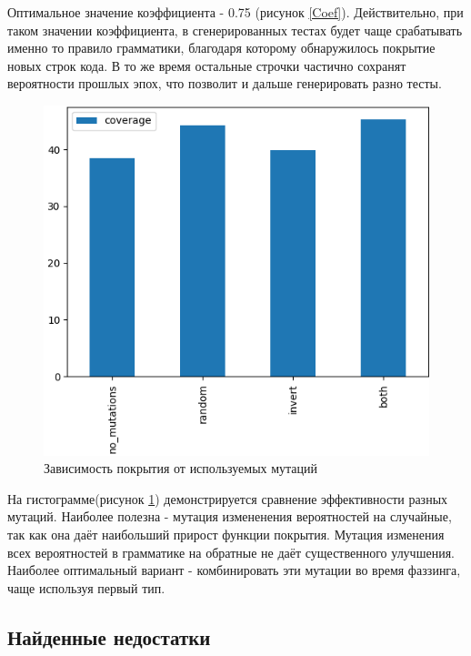 \documentclass[a4paper]{article}
\begin{document}
Оптимальное значение коэффициента - 0.75 (рисунок \ref{Coef}). Действительно, при таком значении коэффициента, в сгенерированных тестах будет чаще срабатывать именно то правило грамматики, благодаря которому обнаружилось покрытие новых строк кода. В то же время остальные строчки частично сохранят вероятности прошлых эпох, что позволит и дальше генерировать разно тесты.

\begin{figure}[ht!]
    \includegraphics[width=150mm]{mutations.png}
    \caption{Зависимость покрытия от используемых мутаций}
    \label{Mutations}
    \end{figure}

На гистограмме(рисунок \ref{Mutations}) демонстрируется сравнение эффективности разных мутаций. Наиболее полезна - мутация измененения вероятностей на случайные, так как она даёт наибольший прирост функции покрытия. Мутация изменения всех вероятностей в грамматике на обратные не даёт существенного улучшения. Наиболее оптимальный вариант - комбинировать эти мутации во время фаззинга, чаще используя первый тип.

\subsection{Найденные недостатки}
\end{document}
